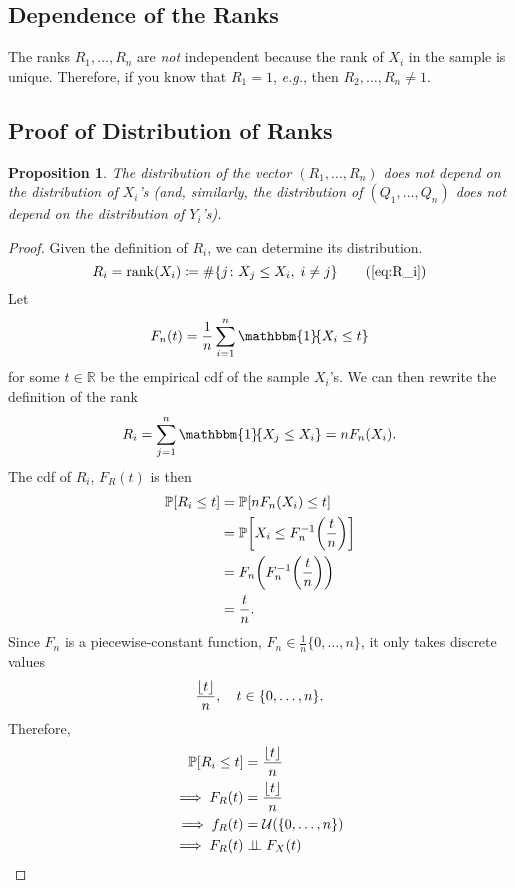\documentclass[letterpaper, oneside, reqno]{amsart}
\newtheorem{prop}{Proposition}[section]
\numberwithin{equation}{section}
\DeclarePairedDelimiter{\floor}{\lfloor}{\rfloor}
\newcommand{\Prob}[1]{\mathbb{P}\mleft[#1\mright]}
\newcommand{\R}{\mathbb{R}}  %
\newcommand{\indep}{\perp \!\!\! \perp}  %
\newcommand{\indic}[1]{\mathbbm{1}\!\mleft\{#1\mright\}} %
\newcommand{\sumi}[2]{\sum_{#1=1}^{#2}}
\newcommand{\avg}[2]{\frac{1}{#2}\sumi{#1}{#2}}
\begin{document}
\subsection{Dependence of the Ranks}
The ranks $R_1, \dots, R_n$ are \emph{not} independent because the rank of $X_i$
in the sample is unique. Therefore, if you know that $R_1 = 1$, \emph{e.g.}, then
$R_2,\dots,R_n \ne 1$.

\subsection{Proof of Distribution of Ranks}
\begin{prop}
  The distribution of the vector $(R_1, \dots, R_n)$ does \emph{not} depend on
  the distribution of $X_i$'s (and, similarly, the distribution of $(Q_1,
  \dots, Q_n)$ does not depend on the distribution of $Y_i$'s).
\end{prop}

\begin{proof}
  Given the definition of $R_i$, we can determine its distribution. 
  \[ R_i = \operatorname{rank}(X_i) \coloneqq \#\{j \colon X_j \le X_i, \; i \ne j\} \tag{\ref{eq:R_i}} \]
  Let 
  \[ F_n(t) = \avg{i}{n} \indic{X_i \le t} \] 
  for some $t \in \R$ be the empirical cdf of the sample $X_i$'s. 
  We can then rewrite the definition of the rank
  \[ R_i = \sumi{j}{n} \indic{X_j \le X_i} = n F_n(X_i). \]
  The cdf of $R_i$, $F_R(t)$ is then
  \begin{alignat*}{3}
    \Prob{R_i \le t} &= \Prob{n F_n(X_i) \le t} \\
                     &= \Prob{X_i \le F_n^{-1}\mleft(\frac{t}{n}\mright)} \\
                     &= F_n\mleft(F_n^{-1}\mleft(\frac{t}{n}\mright)\mright) \\
                     &= \frac{t}{n}.
  \end{alignat*}
  Since $F_n$ is a piecewise-constant function, $F_n \in \frac{1}{n} \{0, \dots, n\}$,
  it only takes discrete values 
  \[ \frac{\floor{t}}{n}, \quad t \in \{0, \dots, n\}. \]
  Therefore,
  \begin{alignat*}{3}
    \Prob{R_i \le t} &= \frac{\floor{t}}{n} \\
    \implies F_R(t) &= \frac{\floor{t}}{n} \\
    \implies f_R(t) &= \mathcal{U}(\{0,\dots,n\}) \\
    \implies F_R(t) &\indep F_X(t) \qedhere
  \end{alignat*}
\end{proof}
\end{document}
